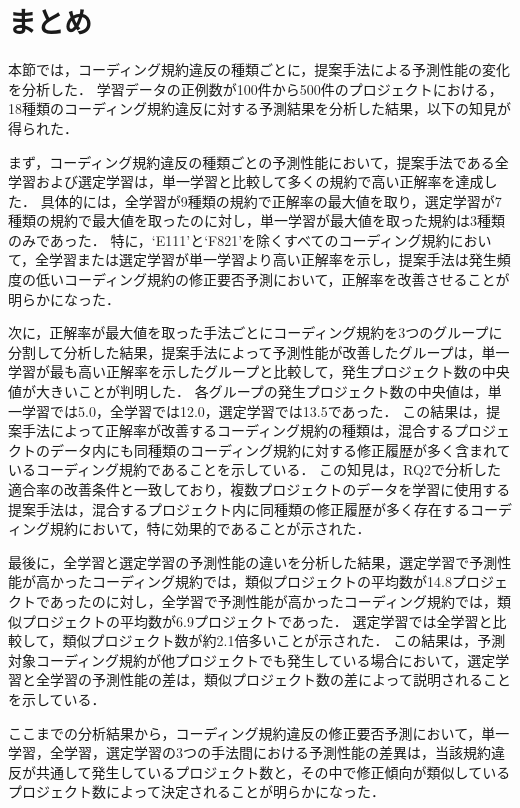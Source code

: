 \documentclass[11pt]{jreport}
\begin{document}
\section{まとめ}

本節では，コーディング規約違反の種類ごとに，提案手法による予測性能の変化を分析した．
学習データの正例数が100件から500件のプロジェクトにおける，18種類のコーディング規約違反に対する予測結果を分析した結果，以下の知見が得られた．

まず，コーディング規約違反の種類ごとの予測性能において，提案手法である全学習および選定学習は，単一学習と比較して多くの規約で高い正解率を達成した．
具体的には，全学習が9種類の規約で正解率の最大値を取り，選定学習が7種類の規約で最大値を取ったのに対し，単一学習が最大値を取った規約は3種類のみであった．
特に，`E111'と`F821'を除くすべてのコーディング規約において，全学習または選定学習が単一学習より高い正解率を示し，提案手法は発生頻度の低いコーディング規約の修正要否予測において，正解率を改善させることが明らかになった．

次に，正解率が最大値を取った手法ごとにコーディング規約を3つのグループに分割して分析した結果，提案手法によって予測性能が改善したグループは，単一学習が最も高い正解率を示したグループと比較して，発生プロジェクト数の中央値が大きいことが判明した．
各グループの発生プロジェクト数の中央値は，単一学習では5.0，全学習では12.0，選定学習では13.5であった．
この結果は，提案手法によって正解率が改善するコーディング規約の種類は，混合するプロジェクトのデータ内にも同種類のコーディング規約に対する修正履歴が多く含まれているコーディング規約であることを示している．
この知見は，RQ2で分析した適合率の改善条件と一致しており，複数プロジェクトのデータを学習に使用する提案手法は，混合するプロジェクト内に同種類の修正履歴が多く存在するコーディング規約において，特に効果的であることが示された．

最後に，全学習と選定学習の予測性能の違いを分析した結果，選定学習で予測性能が高かったコーディング規約では，類似プロジェクトの平均数が14.8プロジェクトであったのに対し，全学習で予測性能が高かったコーディング規約では，類似プロジェクトの平均数が6.9プロジェクトであった．
選定学習では全学習と比較して，類似プロジェクト数が約2.1倍多いことが示された．
この結果は，予測対象コーディング規約が他プロジェクトでも発生している場合において，選定学習と全学習の予測性能の差は，類似プロジェクト数の差によって説明されることを示している．

ここまでの分析結果から，コーディング規約違反の修正要否予測において，単一学習，全学習，選定学習の3つの手法間における予測性能の差異は，当該規約違反が共通して発生しているプロジェクト数と，その中で修正傾向が類似しているプロジェクト数によって決定されることが明らかになった．
\end{document}
